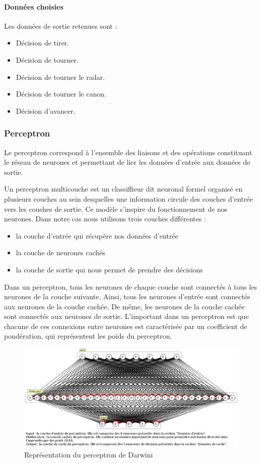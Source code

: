 \documentclass[a4paper,11pt]{article}
\begin{document}
\paragraph{Données choisies}
Les données de sortie retenues sont :

\begin{itemize}
\item Décision de tirer.
\item Décision de tourner.
\item Décision de tourner le radar.
\item Décision de tourner le canon.
\item Décision d'avancer.
\end{itemize}

\subsubsection{Perceptron}
Le perceptron correspond à l'ensemble des liaisons et des opérations constituant le réseau de neurones et permettant de lier les données d'entrée aux données de sortie. 

Un perceptron multicouche est un classiffieur dit neuronal formel organisé en
plusieurs couches au sein desquelles une information circule des couches d'entrée
vers les couches de sortie. Ce modèle s'inspire du fonctionnement de nos neurones.
Dans notre cas nous utilisons trois couches différentes :

\begin{itemize}
\item la couche d'entrée qui récupère nos données d'entrée
\item la couche de neurones cachés
\item la couche de sortie qui nous permet de prendre des décisions
\end{itemize}

Dans un perceptron, tous les neurones de chaque couche sont connectés à tous les
neurones de la couche suivante. Ainsi, tous les neurones d'entrée sont connectés
aux neurones de la couche cachée. De même, les neurones de la couche cachée sont
connectés aux neurones de sortie. L'important dans un perceptron est que chacune
de ces connexions entre neurones est caractérisée par un coefficient de pondération,
qui représentent les poids du perceptron. 

\begin{figure}[!h]
\centering
\includegraphics{images/global_network.png}
\caption{Représentation du perceptron de Darwini}
\label{darwini_perceptron}
\end{figure}
\end{document}
